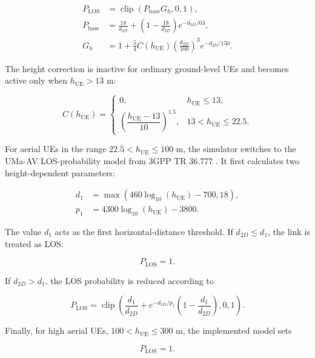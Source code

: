 \begin{align}
    P_{\mathrm{LOS}}
    &= \operatorname{clip}\left(P_{\mathrm{base}}G_h,0,1\right),\\
    P_{\mathrm{base}}
    &= \frac{18}{d_{2D}}+
       \left(1-\frac{18}{d_{2D}}\right)
       e^{-d_{2D}/63},\\
    G_h
    &= 1+\frac{5}{4}C(h_{\mathrm{UE}})
       \left(\frac{d_{2D}}{100}\right)^3
       e^{-d_{2D}/150}.
\end{align}

The height correction is inactive for ordinary ground-level UEs and becomes active only when \(h_{\mathrm{UE}}>13\) m:

\begin{equation}
C(h_{\mathrm{UE}})=
\begin{cases}
0, & h_{\mathrm{UE}}\le13,\\
\left(\dfrac{h_{\mathrm{UE}}-13}{10}\right)^{1.5},
& 13<h_{\mathrm{UE}}\le22.5.
\end{cases}
\end{equation}

For aerial UEs in the range \(22.5<h_{\mathrm{UE}}\le100\) m, the simulator switches to the UMa-AV LOS-probability model from 3GPP TR 36.777 \cite{3gpp_36777}. It first calculates two height-dependent parameters:

\begin{align}
    d_1 &= \max\left(460\log_{10}(h_{\mathrm{UE}})-700,18\right),\\
    p_1 &= 4300\log_{10}(h_{\mathrm{UE}})-3800.
\end{align}

The value \(d_1\) acts as the first horizontal-distance threshold. If \(d_{2D}\le d_1\), the link is treated as LOS:

\begin{equation}
    P_{\mathrm{LOS}}=1.
\end{equation}

If \(d_{2D}>d_1\), the LOS probability is reduced according to

\begin{equation}
    P_{\mathrm{LOS}}=
    \operatorname{clip}\left(
    \frac{d_1}{d_{2D}}+
    e^{-d_{2D}/p_1}
    \left(1-\frac{d_1}{d_{2D}}\right),
    0,1\right).
\end{equation}

Finally, for high aerial UEs, \(100<h_{\mathrm{UE}}\le300\) m, the implemented model sets

\begin{equation}
    P_{\mathrm{LOS}}=1.
\end{equation}

